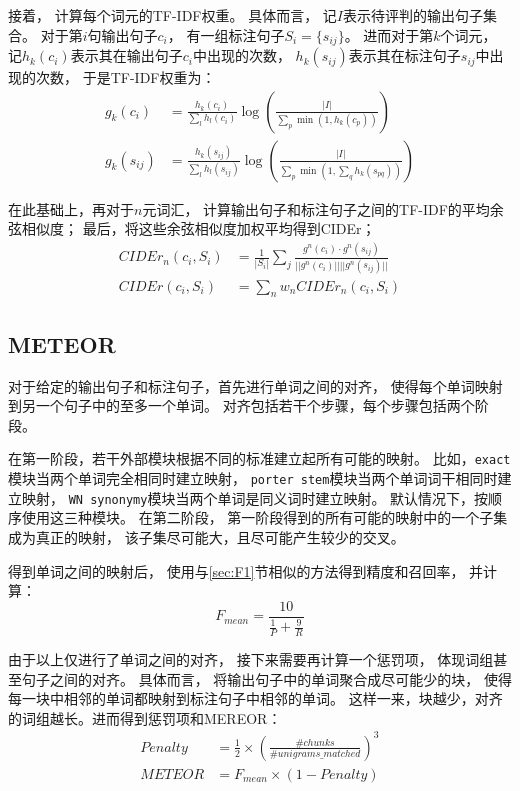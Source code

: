 \documentclass[12pt]{article}
\begin{document}
接着，
计算每个词元的TF-IDF权重。
具体而言，
记$I$表示待评判的输出句子集合。
对于第$i$句输出句子$c_i$，
有一组标注句子$S_i = \{s_{ij}\}$。
进而对于第$k$个词元，
记$h_k(c_i)$表示其在输出句子$c_i$中出现的次数，
$h_k(s_{ij})$表示其在标注句子$s_{ij}$中出现的次数，
于是TF-IDF权重为：
\begin{align*}
	g_k(c_i) &= \frac{h_k(c_i)}{\sum_l h_l(c_i)} \log (\frac{|I|}{\sum_p \min(1, h_k(c_p))}) \\
	g_k(s_{ij}) &= \frac{h_k(s_{ij})}{\sum_l h_l(s_{ij})} \log (\frac{|I|}{\sum_p \min(1, \sum_q h_k(s_{pq}))})
\end{align*}

在此基础上，再对于$n$元词汇，
计算输出句子和标注句子之间的TF-IDF的平均余弦相似度；
最后，将这些余弦相似度加权平均得到CIDEr；
\begin{align*}
	CIDEr_n(c_i, S_i) &= \frac{1}{|S_i|} \sum_j 
	\frac{g^n(c_i) \cdot g^n(s_{ij})}
	{||g^n(c_i)|| ||g^n(s_{ij})||} \\
	CIDEr(c_i, S_i) &= \sum_n w_n CIDEr_n(c_i, S_i)
\end{align*}

\subsection{METEOR}
\label{sec:METEOR}

对于给定的输出句子和标注句子，首先进行单词之间的对齐，
使得每个单词映射到另一个句子中的至多一个单词。
对齐包括若干个步骤，每个步骤包括两个阶段。

在第一阶段，若干外部模块根据不同的标准建立起所有可能的映射。
比如，\verb|exact|模块当两个单词完全相同时建立映射，
\verb|porter stem|模块当两个单词词干相同时建立映射，
\verb|WN synonymy|模块当两个单词是同义词时建立映射。
默认情况下，按顺序使用这三种模块。
在第二阶段，
第一阶段得到的所有可能的映射中的一个子集成为真正的映射，
该子集尽可能大，且尽可能产生较少的交叉。

得到单词之间的映射后，
使用与\ref{sec:F1}节相似的方法得到精度和召回率，
并计算：
\begin{equation*}
	F_{mean} = \frac{10}{\frac{1}{P} + \frac{9}{R}} 
\end{equation*}

由于以上仅进行了单词之间的对齐，
接下来需要再计算一个惩罚项，
体现词组甚至句子之间的对齐。
具体而言，
将输出句子中的单词聚合成尽可能少的块，
使得每一块中相邻的单词都映射到标注句子中相邻的单词。
这样一来，块越少，对齐的词组越长。进而得到惩罚项和MEREOR：
\begin{align*}
	Penalty &= \frac{1}{2} \times (\frac{\#chunks}{\#unigrams\_matched})^3 \\
	METEOR &= F_{mean} \times (1 − Penalty)
\end{align*}
\end{document}
